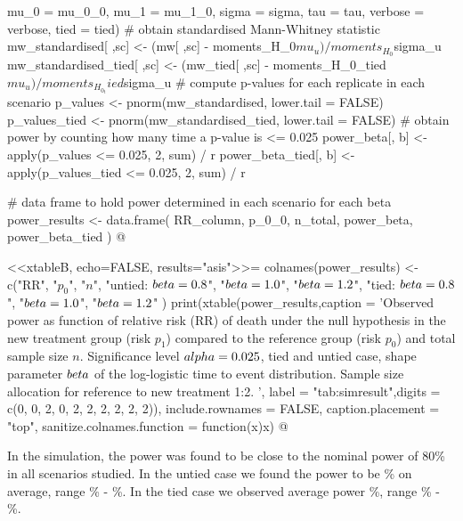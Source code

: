 \documentclass[bimj,fleqn]{w-art}
\theoremstyle{plain}
\theoremstyle{definition}
\begin{document}
{{                                mu_0 = mu_0_0, mu_1 = mu_1_0,
                                sigma = sigma, tau = tau,
                                verbose = verbose, tied = tied)
    # obtain standardised Mann-Whitney statistic
    mw_standardised[ ,sc] <- (mw[ ,sc] - moments_H_0$mu_u) / moments_H_0$sigma_u
    mw_standardised_tied[ ,sc] <- (mw_tied[ ,sc] - moments_H_0_tied$mu_u) / moments_H_0_tied$sigma_u
  }
  # compute p-values for each replicate in each scenario
  p_values <- pnorm(mw_standardised, lower.tail = FALSE)
  p_values_tied <- pnorm(mw_standardised_tied, lower.tail = FALSE)
  # obtain power by counting how many time a p-value is <= 0.025
  power_beta[, b] <- apply(p_values <= 0.025, 2, sum) / r
  power_beta_tied[, b] <- apply(p_values_tied <= 0.025, 2, sum) / r
}

# data frame to hold power determined in each scenario for each beta
power_results <- data.frame(
  RR_column,
  p_0_0,
  n_total,
  power_beta,
  power_beta_tied
)
@


<<xtableB, echo=FALSE, results="asis">>=
colnames(power_results) <- c("RR", "$p_0$",
                                 "$n$",
                                 "untied: $\\beta = 0.8$",
                                 "$\\beta = 1.0$",
                                 "$\\beta = 1.2$",
                                 "tied: $\\beta = 0.8$",
                                 "$\\beta = 1.0$",
                                 "$\\beta = 1.2$"
                                 )
print(xtable(power_results,caption = 'Observed power as function of relative risk
             (RR) of death under the null hypothesis in the new treatment group
             (risk $p_1$) compared to the reference group (risk $p_0$) and total
             sample size $n$.
             Significance level $\\alpha =0.025$, tied and untied case,
             shape parameter $\\beta$ of the log-logistic time to event
             distribution. Sample size allocation for reference to new treatment 1:2. ',
             label = "tab:simresult",digits = c(0, 0, 2, 0, 2, 2, 2, 2, 2, 2)),
      include.rownames = FALSE,
      caption.placement = "top",
      sanitize.colnames.function = function(x){x})
@

In the simulation, the power was found to be close to the nominal power of 80\%
in all scenarios studied. In the untied case we found the power to be
 \% on average, range
 \% -  \%.
In the tied case we observed average power
 \%, range
 \% -  \%.
\end{document}

